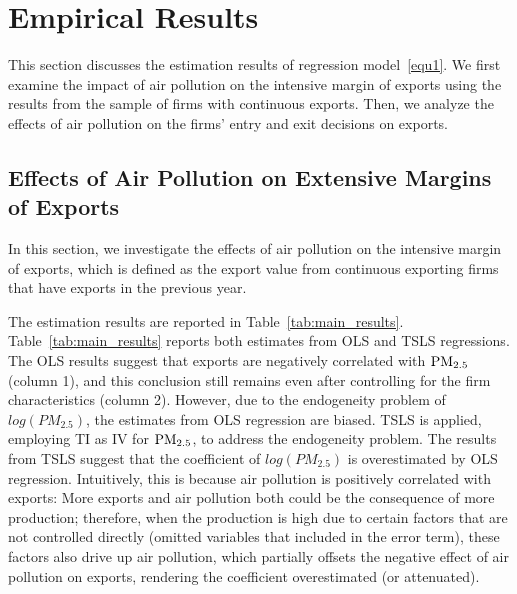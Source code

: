 \documentclass[12pt]{article}
\begin{document}
\section{Empirical Results} \label{sec:4}

This section discusses the estimation results of regression model~\ref{equ1}. We first examine the impact of air pollution on the intensive margin of exports using the results from the sample of firms with continuous exports. Then, we analyze the effects of air pollution on the firms' entry and exit decisions on exports. 

\subsection{Effects of Air Pollution on Extensive Margins of Exports} \label{sec:4.1}

In this section, we investigate the effects of air pollution on the intensive
margin of exports, which is defined as the export value from continuous exporting firms that have exports in
the previous year. 

The estimation results are reported in Table~\ref{tab:main_results}.
Table~\ref{tab:main_results} reports both estimates from OLS and TSLS
regressions. The OLS results suggest that exports are negatively correlated with $\rm PM_{2.5}$ (column 1), and this conclusion still remains even after controlling for the firm characteristics (column 2). However, due to the endogeneity problem of $log(PM_{2.5})$, the estimates from OLS regression are biased.
TSLS is applied, employing TI as IV for $\rm PM_{2.5}$, to address the endogeneity problem. The results from TSLS suggest that the coefficient of $log(PM_{2.5})$ is overestimated by OLS regression. Intuitively, this is because air pollution is positively
correlated with exports: More exports and air pollution both could be the consequence of more production; therefore, when the production is high due to
certain factors that are not controlled directly (omitted variables that
included in the error term), these factors also drive up air pollution,
which partially offsets the negative effect of air pollution on exports,
rendering the coefficient overestimated (or attenuated). 
\end{document}
